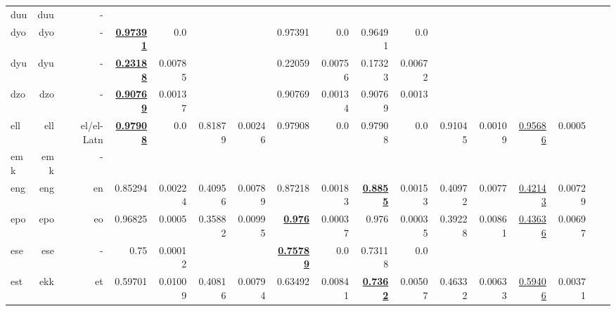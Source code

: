 \documentclass[11pt]{article}
\begin{document}
\begin{table*}[h]
{\begin{tabular}{lrrrrrrrrrrrrrrrr}
duu         & duu         & -         &          &          &          &          &          &          &          &          &          &          &          &          \\
dyo         & dyo         & -         & \textbf{\underline{0.97391}}         & 0.0         &          &          & 0.97391         & 0.0         & 0.96491         & 0.0         &          &          &          &          \\
dyu         & dyu         & -         & \textbf{\underline{0.23188}}         & 0.00785         &          &          & 0.22059         & 0.00756         & 0.17323         & 0.00672         &          &          &          &          \\
dzo         & dzo         & -         & \textbf{\underline{0.90769}}         & 0.00137         &          &          & 0.90769         & 0.00134         & 0.90769         & 0.0013         &          &          &          &          \\
ell         & ell         & el/el-Latn         & \textbf{\underline{0.97908}}         & 0.0         & 0.81879         & 0.00246         & 0.97908         & 0.0         & 0.97908         & 0.0         & 0.91045         & 0.00109         & \underline{0.95686}         & 0.0005         \\
emk         & emk         & -         &          &          &          &          &          &          &          &          &          &          &          &          \\
eng         & eng         & en         & 0.85294         & 0.00224         & 0.40956         & 0.00789         & 0.87218         & 0.00183         & \textbf{\underline{0.8855}}         & 0.00153         & 0.40972         & 0.0077         & \underline{0.42143}         & 0.00729         \\
epo         & epo         & eo         & 0.96825         & 0.0005         & 0.35882         & 0.00995         & \textbf{\underline{0.976}}         & 0.00037         & 0.976         & 0.00035         & 0.39228         & 0.00861         & \underline{0.43636}         & 0.00697         \\
ese         & ese         & -         & 0.75         & 0.00012         &          &          & \textbf{\underline{0.75789}}         & 0.0         & 0.73118         & 0.0         &          &          &          &          \\
est         & ekk         & et         & 0.59701         & 0.01009         & 0.40816         & 0.00794         & 0.63492         & 0.00841         & \textbf{\underline{0.7362}}         & 0.00507         & 0.46332         & 0.00633         & \underline{0.59406}         & 0.00371         \\

\end{tabular}}
\end{table*}
\end{document}
